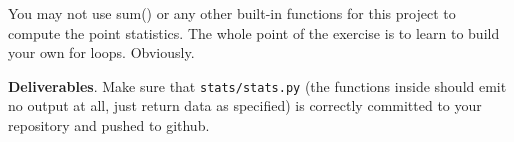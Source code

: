 \begin{fullwidth}
\begin{callout}{\bctakecare}
You may not use sum() or any other built-in functions for this project to compute the point statistics.  The whole point of the exercise is to learn to build your own for loops. Obviously.
\end{callout}

\begin{callout}{\bcplume}
{\bf Deliverables}. Make sure that {\tt stats/stats.py} (the functions inside should emit no output at all, just return data as specified) is correctly committed to your repository and pushed to github. 
\end{callout}


\end{fullwidth}


